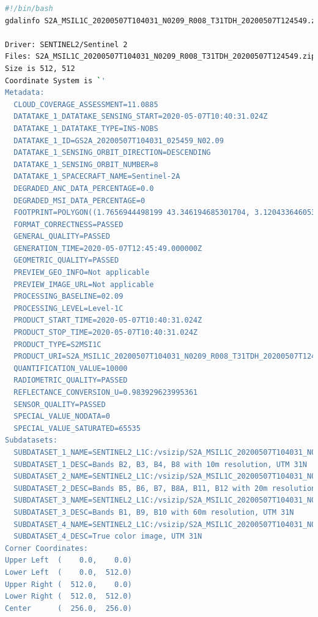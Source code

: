 \documentclass[a4paper,11pt]{article}
\theoremstyle{mytheor}
\begin{document}
\begin{lstlisting}[language=bash,caption={bash version}]
#!/bin/bash
gdalinfo S2A_MSIL1C_20200507T104031_N0209_R008_T31TDH_20200507T124549.zip 

Driver: SENTINEL2/Sentinel 2
Files: S2A_MSIL1C_20200507T104031_N0209_R008_T31TDH_20200507T124549.zip
Size is 512, 512
Coordinate System is `'
Metadata:
  CLOUD_COVERAGE_ASSESSMENT=11.0885
  DATATAKE_1_DATATAKE_SENSING_START=2020-05-07T10:40:31.024Z
  DATATAKE_1_DATATAKE_TYPE=INS-NOBS
  DATATAKE_1_ID=GS2A_20200507T104031_025459_N02.09
  DATATAKE_1_SENSING_ORBIT_DIRECTION=DESCENDING
  DATATAKE_1_SENSING_ORBIT_NUMBER=8
  DATATAKE_1_SPACECRAFT_NAME=Sentinel-2A
  DEGRADED_ANC_DATA_PERCENTAGE=0.0
  DEGRADED_MSI_DATA_PERCENTAGE=0
  FOOTPRINT=POLYGON((1.7656944498199 43.346194685301704, 3.120433646053401 43.352791985217806, 3.118527220871465 42.364010656318975, 1.785227256908992 42.35763630855867, 1.7656944498199 43.346194685301704))
  FORMAT_CORRECTNESS=PASSED
  GENERAL_QUALITY=PASSED
  GENERATION_TIME=2020-05-07T12:45:49.000000Z
  GEOMETRIC_QUALITY=PASSED
  PREVIEW_GEO_INFO=Not applicable
  PREVIEW_IMAGE_URL=Not applicable
  PROCESSING_BASELINE=02.09
  PROCESSING_LEVEL=Level-1C
  PRODUCT_START_TIME=2020-05-07T10:40:31.024Z
  PRODUCT_STOP_TIME=2020-05-07T10:40:31.024Z
  PRODUCT_TYPE=S2MSI1C
  PRODUCT_URI=S2A_MSIL1C_20200507T104031_N0209_R008_T31TDH_20200507T124549.SAFE
  QUANTIFICATION_VALUE=10000
  RADIOMETRIC_QUALITY=PASSED
  REFLECTANCE_CONVERSION_U=0.983929623995361
  SENSOR_QUALITY=PASSED
  SPECIAL_VALUE_NODATA=0
  SPECIAL_VALUE_SATURATED=65535
Subdatasets:
  SUBDATASET_1_NAME=SENTINEL2_L1C:/vsizip/S2A_MSIL1C_20200507T104031_N0209_R008_T31TDH_20200507T124549.zip/S2A_MSIL1C_20200507T104031_N0209_R008_T31TDH_20200507T124549.SAFE/MTD_MSIL1C.xml:10m:EPSG_32631
  SUBDATASET_1_DESC=Bands B2, B3, B4, B8 with 10m resolution, UTM 31N
  SUBDATASET_2_NAME=SENTINEL2_L1C:/vsizip/S2A_MSIL1C_20200507T104031_N0209_R008_T31TDH_20200507T124549.zip/S2A_MSIL1C_20200507T104031_N0209_R008_T31TDH_20200507T124549.SAFE/MTD_MSIL1C.xml:20m:EPSG_32631
  SUBDATASET_2_DESC=Bands B5, B6, B7, B8A, B11, B12 with 20m resolution, UTM 31N
  SUBDATASET_3_NAME=SENTINEL2_L1C:/vsizip/S2A_MSIL1C_20200507T104031_N0209_R008_T31TDH_20200507T124549.zip/S2A_MSIL1C_20200507T104031_N0209_R008_T31TDH_20200507T124549.SAFE/MTD_MSIL1C.xml:60m:EPSG_32631
  SUBDATASET_3_DESC=Bands B1, B9, B10 with 60m resolution, UTM 31N
  SUBDATASET_4_NAME=SENTINEL2_L1C:/vsizip/S2A_MSIL1C_20200507T104031_N0209_R008_T31TDH_20200507T124549.zip/S2A_MSIL1C_20200507T104031_N0209_R008_T31TDH_20200507T124549.SAFE/MTD_MSIL1C.xml:TCI:EPSG_32631
  SUBDATASET_4_DESC=True color image, UTM 31N
Corner Coordinates:
Upper Left  (    0.0,    0.0)
Lower Left  (    0.0,  512.0)
Upper Right (  512.0,    0.0)
Lower Right (  512.0,  512.0)
Center      (  256.0,  256.0)


\end{lstlisting}
\end{document}
